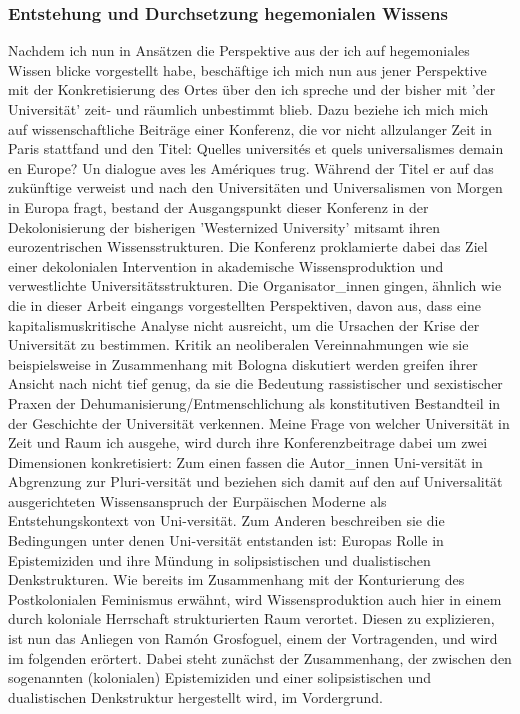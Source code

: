 \subsubsection{Entstehung und Durchsetzung hegemonialen Wissens}

Nachdem ich nun in Ansätzen die Perspektive aus der ich auf hegemoniales Wissen
blicke vorgestellt habe, beschäftige ich mich nun aus jener Perspektive mit der
Konkretisierung des Ortes über den ich spreche und der bisher mit 'der
Universität' zeit- und räumlich unbestimmt blieb. Dazu beziehe ich mich mich
auf wissenschaftliche Beiträge einer Konferenz, die vor nicht allzulanger Zeit
in Paris stattfand und den Titel: \glqq Quelles universités et quels
universalismes demain en Europe? Un dialogue aves les Amériques \grqq
\footnotemark {} trug. Während der Titel er auf das zukünftige
verweist und nach den Universitäten und Universalismen von Morgen in Europa
fragt, bestand der Ausgangspunkt dieser Konferenz in der Dekolonisierung der
bisherigen 'Westernized University' mitsamt ihren eurozentrischen
Wissensstrukturen. Die Konferenz proklamierte dabei das Ziel einer dekolonialen
Intervention in akademische Wissensproduktion und verwestlichte
Universitätsstrukturen. Die Organisator\_innen gingen, ähnlich wie die in dieser
Arbeit eingangs vorgestellten Perspektiven, davon aus, dass eine
kapitalismuskritische Analyse nicht ausreicht, um die Ursachen der Krise der
Universität zu bestimmen. Kritik an neoliberalen Vereinnahmungen wie sie
beispielsweise in Zusammenhang mit Bologna diskutiert werden \footnotemark
{} greifen ihrer
Ansicht nach nicht tief genug, da sie die Bedeutung rassistischer und
sexistischer Praxen der Dehumanisierung/Entmenschlichung als konstitutiven
Bestandteil in der Geschichte der Universität verkennen. Meine Frage von
welcher Universität in Zeit und Raum ich ausgehe, wird durch ihre
Konferenzbeitrage dabei um zwei Dimensionen konkretisiert: Zum einen fassen die
Autor\_innen Uni-versität in Abgrenzung zur Pluri-versität und beziehen sich
damit auf den auf Universalität ausgerichteten Wissensanspruch der Eurpäischen
Moderne als Entstehungskontext von Uni-versität. Zum Anderen beschreiben sie
die Bedingungen unter denen Uni-versität entstanden ist: Europas Rolle in
Epistemiziden und ihre Mündung in solipsistischen und dualistischen
Denkstrukturen. Wie bereits im Zusammenhang mit der Konturierung des
Postkolonialen Feminismus erwähnt, wird Wissensproduktion auch hier in einem
durch koloniale Herrschaft strukturierten Raum verortet. Diesen zu explizieren,
ist nun das Anliegen von Ramón Grosfoguel, einem der Vortragenden, und wird im
folgenden erörtert. \footnotemark {} Dabei steht zunächst der Zusammenhang, der zwischen
den sogenannten (kolonialen) Epistemiziden und einer solipsistischen und
dualistischen Denkstruktur hergestellt wird, im Vordergrund.  

